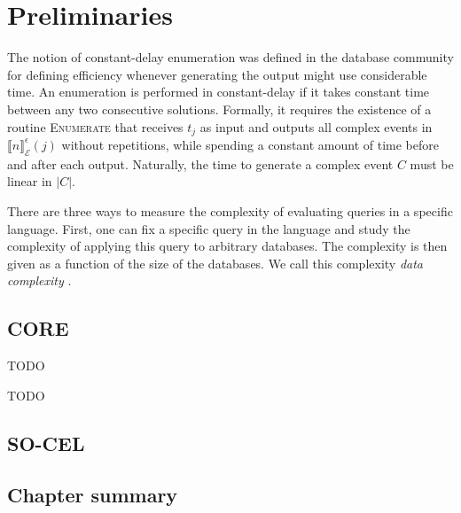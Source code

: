 \chapter{Preliminaries}\label{chapter:preliminaries}

The notion of constant-delay enumeration was defined in the database community \cite{constant-delay-1 , constant-delay-2} for defining efficiency whenever generating the output might use considerable time. An enumeration is performed in constant-delay if it takes constant time between any two consecutive solutions. Formally, it requires the existence of a routine \textsc{Enumerate} that receives $t_{j}$ as input and outputs all complex events in $\llbracket n \rrbracket^{\epsilon}_{\mathcal{E}}(j)$ without repetitions, while spending a constant amount of time before and after each output. Naturally, the time to generate a complex event $C$ must be linear in $|C|$.

There are three ways to measure the complexity of evaluating queries in a specific language. First, one can fix a specific query in the language and study the complexity of applying this query to arbitrary databases. The complexity is then given as a function of the size of the databases. We call this complexity \textit{data complexity} \cite{data-complexity}.

\section{CORE}

\begin{definition}[Match]
  \label{def:match}
  TODO
\end{definition}

\begin{definition}
  \label{def:maximalmatch}
  TODO
\end{definition}

\section{SO-CEL}



\section{Chapter summary}
